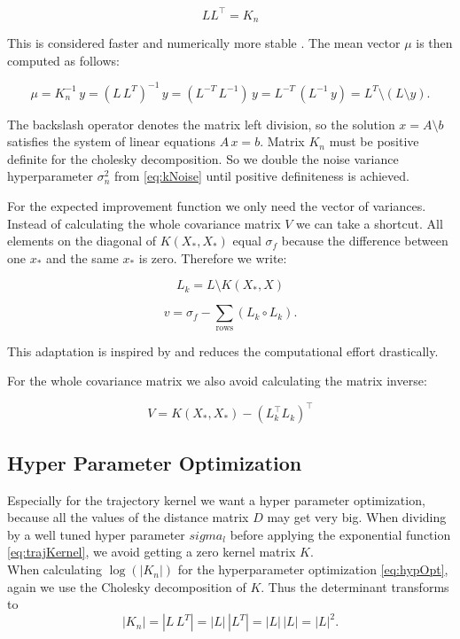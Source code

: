 $$LL^\top=K_n$$

This is considered faster and numerically more stable \cite{rasmussen2006gaussian}. The mean vector $\mu$ is then computed as follows:

\begin{equation} \label{eq:regression}
    \mu = K_n^{-1}\,y = (L\,L^{T})^{-1}\,y = (L^{-T}\,L^{-1})\,y = L^{-T}\,(L^{-1}\,y) = L^{T}\setminus(L \setminus y).
\end{equation}

The backslash operator denotes the matrix left division, so the solution $x=A\setminus b$ satisfies the system of linear equations $A\,x=b$.
Matrix $K_n$ must be positive definite for the cholesky decomposition. So we double the noise variance hyperparameter $\sigma_n^2$ from \eqref{eq:kNoise} until positive definiteness is achieved.

For the expected improvement function we only need the vector of variances. Instead of calculating the whole covariance matrix $V$ we can take a shortcut. All elements on the diagonal of $K(X_*,X_*)$ equal $\sigma_f$ because the difference between one $x_*$ and the same $x_*$ is zero. Therefore we write:

$$L_k = L \setminus K(X_*,X)$$

$$v = \sigma_f - \sum_{\text{rows}} (L_k \circ L_k).$$

This adaptation is inspired by \cite{nandoCode} and reduces the computational effort drastically.

For the whole covariance matrix we also avoid calculating the matrix inverse:

$$V = K(X_*,X_*) - (L_k^\top L_k)^\top $$

\subsection{Hyper Parameter Optimization}
Especially for the trajectory kernel we want a hyper parameter optimization, because all the values of the distance matrix $D$ may get very big. When dividing by a well tuned hyper parameter $sigma_l$ before applying the exponential function \eqref{eq:trajKernel}, we avoid getting a zero kernel matrix $K$.\\

When calculating $\log(|K_n|)$ for the hyperparameter optimization \eqref{eq:hypOpt}, again we use the Cholesky decomposition of $K$. Thus the determinant transforms to
$$|K_n|=|L\,L^{T}|=|L|\,|L^{T}|=|L|\,|L|=|L|^{2}.$$

